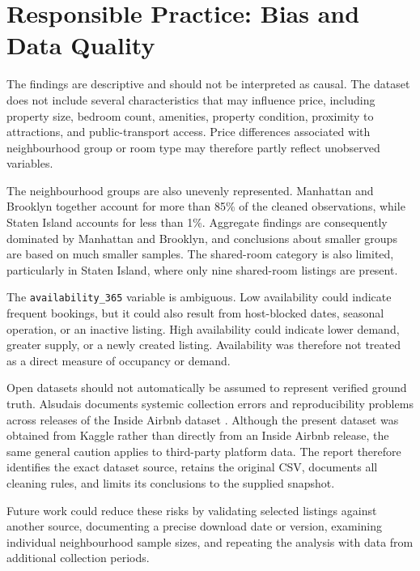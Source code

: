 \section{Responsible Practice: Bias and Data Quality}

The findings are descriptive and should not be interpreted as causal. The
dataset does not include several characteristics that may influence price,
including property size, bedroom count, amenities, property condition,
proximity to attractions, and public-transport access. Price differences
associated with neighbourhood group or room type may therefore partly reflect
unobserved variables.

The neighbourhood groups are also unevenly represented. Manhattan and Brooklyn
together account for more than 85\% of the cleaned observations, while Staten
Island accounts for less than 1\%. Aggregate findings are consequently
dominated by Manhattan and Brooklyn, and conclusions about smaller groups are
based on much smaller samples. The shared-room category is also limited,
particularly in Staten Island, where only nine shared-room listings are
present.

The \texttt{availability\_365} variable is ambiguous. Low availability could
indicate frequent bookings, but it could also result from host-blocked dates,
seasonal operation, or an inactive listing. High availability could indicate
lower demand, greater supply, or a newly created listing. Availability was
therefore not treated as a direct measure of occupancy or demand.

Open datasets should not automatically be assumed to represent verified ground
truth. Alsudais documents systemic collection errors and reproducibility
problems across releases of the Inside Airbnb dataset
\parencite{alsudais2020}. Although the present dataset was obtained
from Kaggle rather than directly from an Inside Airbnb release, the same general
caution applies to third-party platform data. The report therefore identifies
the exact dataset source, retains the original CSV, documents all cleaning
rules, and limits its conclusions to the supplied snapshot.

Future work could reduce these risks by validating selected listings against
another source, documenting a precise download date or version, examining
individual neighbourhood sample sizes, and repeating the analysis with data
from additional collection periods.